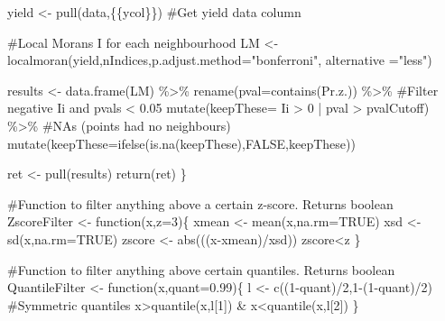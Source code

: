 \documentclass[]{elsarticle} %
\newenvironment{Shaded}{}{}
\newcommand{\AttributeTok}[1]{#1}
\newcommand{\CommentTok}[1]{\textcolor[rgb]{0.00,0.50,0.00}{#1}}
\newcommand{\ConstantTok}[1]{#1}
\newcommand{\ControlFlowTok}[1]{\textcolor[rgb]{0.00,0.00,1.00}{#1}}
\newcommand{\DecValTok}[1]{#1}
\newcommand{\FloatTok}[1]{#1}
\newcommand{\FunctionTok}[1]{#1}
\newcommand{\NormalTok}[1]{#1}
\newcommand{\OtherTok}[1]{\textcolor[rgb]{1.00,0.25,0.00}{#1}}
\newcommand{\SpecialCharTok}[1]{\textcolor[rgb]{0.00,0.50,0.50}{#1}}
\newcommand{\StringTok}[1]{\textcolor[rgb]{0.00,0.50,0.50}{#1}}
\begin{document}
\begin{Shaded}
\begin{Highlighting}[]
\NormalTok{  yield }\OtherTok{\textless{}{-}} \FunctionTok{pull}\NormalTok{(data,\{\{ycol\}\}) }\CommentTok{\#Get yield data column}
  
  \CommentTok{\#Local Moran\textquotesingle{}s I for each neighbourhood}
\NormalTok{  LM }\OtherTok{\textless{}{-}} \FunctionTok{localmoran}\NormalTok{(yield,nIndices,}\AttributeTok{p.adjust.method=}\StringTok{"bonferroni"}\NormalTok{,}
                   \AttributeTok{alternative =}\StringTok{"less"}\NormalTok{)}
  
\NormalTok{  results }\OtherTok{\textless{}{-}} \FunctionTok{data.frame}\NormalTok{(LM) }\SpecialCharTok{\%\textgreater{}\%} 
    \FunctionTok{rename}\NormalTok{(}\StringTok{\textquotesingle{}pval\textquotesingle{}}\OtherTok{=}\FunctionTok{contains}\NormalTok{(}\StringTok{\textquotesingle{}Pr.z.\textquotesingle{}}\NormalTok{)) }\SpecialCharTok{\%\textgreater{}\%} 
    \CommentTok{\#Filter negative Ii and pvals \textless{} 0.05}
    \FunctionTok{mutate}\NormalTok{(}\AttributeTok{keepThese=}\NormalTok{ Ii }\SpecialCharTok{\textgreater{}} \DecValTok{0} \SpecialCharTok{|}\NormalTok{ pval }\SpecialCharTok{\textgreater{}}\NormalTok{ pvalCutoff) }\SpecialCharTok{\%\textgreater{}\%} 
    \CommentTok{\#NAs (points had no neighbours)}
    \FunctionTok{mutate}\NormalTok{(}\AttributeTok{keepThese=}\FunctionTok{ifelse}\NormalTok{(}\FunctionTok{is.na}\NormalTok{(keepThese),}\ConstantTok{FALSE}\NormalTok{,keepThese)) }
  
\NormalTok{  ret }\OtherTok{\textless{}{-}} \FunctionTok{pull}\NormalTok{(results)}
  \FunctionTok{return}\NormalTok{(ret)}
\NormalTok{\}}

\CommentTok{\#Function to filter anything above a certain z{-}score. Returns boolean}
\NormalTok{ZscoreFilter }\OtherTok{\textless{}{-}} \ControlFlowTok{function}\NormalTok{(x,}\AttributeTok{z=}\DecValTok{3}\NormalTok{)\{}
\NormalTok{  xmean }\OtherTok{\textless{}{-}} \FunctionTok{mean}\NormalTok{(x,}\AttributeTok{na.rm=}\ConstantTok{TRUE}\NormalTok{)}
\NormalTok{  xsd }\OtherTok{\textless{}{-}} \FunctionTok{sd}\NormalTok{(x,}\AttributeTok{na.rm=}\ConstantTok{TRUE}\NormalTok{)}
\NormalTok{  zscore }\OtherTok{\textless{}{-}} \FunctionTok{abs}\NormalTok{(((x}\SpecialCharTok{{-}}\NormalTok{xmean)}\SpecialCharTok{/}\NormalTok{xsd))}
\NormalTok{  zscore}\SpecialCharTok{\textless{}}\NormalTok{z}
\NormalTok{\} }

\CommentTok{\#Function to filter anything above certain quantiles. Returns boolean}
\NormalTok{QuantileFilter }\OtherTok{\textless{}{-}} \ControlFlowTok{function}\NormalTok{(x,}\AttributeTok{quant=}\FloatTok{0.99}\NormalTok{)\{ }
\NormalTok{  l }\OtherTok{\textless{}{-}} \FunctionTok{c}\NormalTok{((}\DecValTok{1}\SpecialCharTok{{-}}\NormalTok{quant)}\SpecialCharTok{/}\DecValTok{2}\NormalTok{,}\DecValTok{1}\SpecialCharTok{{-}}\NormalTok{(}\DecValTok{1}\SpecialCharTok{{-}}\NormalTok{quant)}\SpecialCharTok{/}\DecValTok{2}\NormalTok{) }\CommentTok{\#Symmetric quantiles}
\NormalTok{  x}\SpecialCharTok{\textgreater{}}\FunctionTok{quantile}\NormalTok{(x,l[}\DecValTok{1}\NormalTok{]) }\SpecialCharTok{\&}\NormalTok{ x}\SpecialCharTok{\textless{}}\FunctionTok{quantile}\NormalTok{(x,l[}\DecValTok{2}\NormalTok{]) }
\NormalTok{\}}


\end{Highlighting}
\end{Shaded}
\end{document}
